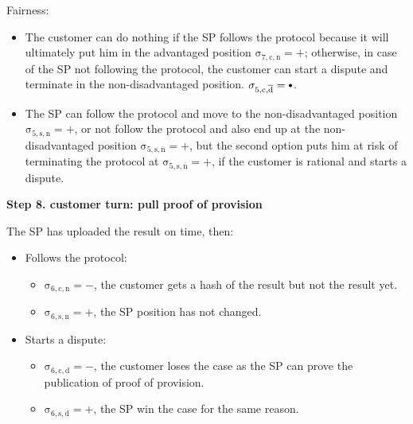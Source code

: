 \documentclass{ieeeaccess}
\newcommand\neutral[1][.75]{\mathbin{\ThisStyle{\vcenter{\hbox{%
  \scalebox{#1}{$\SavedStyle\bullet$}}}}}%
}
\begin{document}
Fairness:

\begin{itemize}

\item
  The customer can do nothing if the SP follows the protocol because it will ultimately put him in the advantaged position \(\operatorname{\sigma_{7, c, n} = +}\); otherwise, in case of the SP not following the protocol, the customer can start a dispute and terminate in the non-disadvantaged position.
  \(\operatorname{\sigma_{5, c, \overline{d}} = \neutral}\).
\item
  The SP can follow the protocol and move to the non-disadvantaged position \(\operatorname{\sigma_{5, s, n} = +}\), or not follow the protocol and also end up at the non-disadvantaged position \(\operatorname{\sigma_{5, s, \overline{n}} = +}\), but the second option puts him at risk of terminating the protocol at \(\operatorname{\sigma_{5, s, \overline{n}} = +}\), if the customer is rational and starts a dispute.
\end{itemize}


\noindent \textbf
{Step 8. customer turn: pull proof of provision}\label{step-8-pull-proof-of-provision}

The SP has uploaded the result on time, then:

\begin{itemize}
\item
  Follows the protocol:

  \begin{itemize}
  
  \item
    \(\operatorname{\sigma_{6, c, n} = -}\), the customer gets a hash of the result but not the result yet.
  \item
    \(\operatorname{\sigma_{6, s, n} = +}\), the SP position has not changed.
  \end{itemize}
\item
  Starts a dispute:

  \begin{itemize}
  
  \item
    \(\operatorname{\sigma_{6, c, d} = -}\), the customer loses the case as the SP can prove the publication of proof of provision. 
  \item
    \(\operatorname{\sigma_{6, s, d} = +}\), the SP win the case for the same reason.
  \end{itemize}
\end{itemize}
\end{document}
